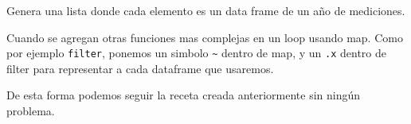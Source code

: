 \documentclass[]{book}
\newenvironment{Shaded}{\begin{snugshade}}{\end{snugshade}}
\newcommand{\DataTypeTok}[1]{\textcolor[rgb]{0.13,0.29,0.53}{#1}}
\newcommand{\DecValTok}[1]{\textcolor[rgb]{0.00,0.00,0.81}{#1}}
\newcommand{\KeywordTok}[1]{\textcolor[rgb]{0.13,0.29,0.53}{\textbf{#1}}}
\newcommand{\NormalTok}[1]{#1}
\newcommand{\OperatorTok}[1]{\textcolor[rgb]{0.81,0.36,0.00}{\textbf{#1}}}
\newcommand{\OtherTok}[1]{\textcolor[rgb]{0.56,0.35,0.01}{#1}}
\newcommand{\StringTok}[1]{\textcolor[rgb]{0.31,0.60,0.02}{#1}}
\begin{document}
Genera una lista donde cada elemento es un data frame de un año de
mediciones.

Cuando se agregan otras funciones mas complejas en un loop usando map.
Como por ejemplo \texttt{filter}, ponemos un simbolo
\texttt{\textasciitilde{}} dentro de map, y un \texttt{.x} dentro de
filter para representar a cada dataframe que usaremos.

\begin{Shaded}
\end{Shaded}

De esta forma podemos seguir la receta creada anteriormente sin ningún
problema.

\begin{Shaded}
\end{Shaded}
\end{document}
